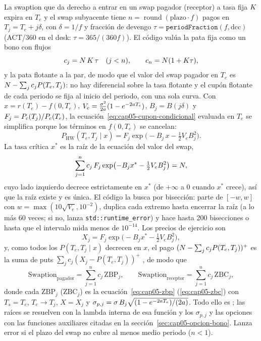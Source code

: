 La swaption que da derecho a entrar en un swap pagador (receptor) a tasa fija $K$ expira en $T_e$ y el swap
subyacente tiene $n=\operatorname{round}(\text{plazo}\cdot f)$ pagos en $T_j=T_e+j\delta$, con $\delta=1/f$
y fracción de devengo $\tau=\texttt{periodFraction}(f,\mathrm{dcc})$ (ACT/360 en el desk: $\tau=365/(360f)$).
El código valúa la pata fija como un bono con flujos
\begin{equation}\label{eq:cap05-flujos}
  c_j = N\,K\,\tau\quad(j<n),\qquad c_n=N(1+K\tau),
\end{equation}
y la pata flotante a la par, de modo que el valor del swap pagador en $T_e$ es
$N-\sum_jc_jP(T_e,T_j)$: no hay diferencial sobre la tasa flotante y el cupón flotante de cada periodo
se fija al inicio del periodo, con una sola curva. Con $x=r(T_e)-f(0,T_e)$, $V_e=\frac{\sigma^2}{2a}(1-e^{-2a
T_e})$, $B_j=B(j\delta)$ y $F_j=P_{c}(T_j)/P_{c}(T_e)$, la ecuación~\eqref{eq:cap05-cupon-condicional}
evaluada en $T_e$ se simplifica porque los términos en $f(0,T_e)$ se cancelan:
\begin{equation}\label{eq:cap05-cupon-x}
  P_{\mathrm{HW}}(T_e,T_j\mid x) = F_j\exp\bigl(-B_j\,x-\tfrac12V_eB_j^{2}\bigr).
\end{equation}
La tasa crítica $x^*$ es la raíz de la ecuación del valor del swap,
\begin{equation}\label{eq:cap05-critica}
  \sum_{j=1}^{n}c_j\,F_j\exp\bigl(-B_jx^*-\tfrac12V_eB_j^{2}\bigr)=N,
\end{equation}
cuyo lado izquierdo decrece estrictamente en $x^*$ (de $+\infty$ a $0$ cuando $x^*$ crece), así que la raíz
existe y es única. El código la busca por bisección: parte de $[-w,w]$ con
$w=\max(10\sqrt{V_e},10^{-2})$, duplica cada extremo hasta encerrar la raíz (a lo más 60 veces; si no, lanza
\texttt{std::runtime\_error}) y hace hasta 200 bisecciones o hasta que el intervalo mida menos de $10^{-14}$.
Los precios de ejercicio son
\begin{equation}\label{eq:cap05-strikes}
  X_j = F_j\exp\bigl(-B_jx^*-\tfrac12V_eB_j^{2}\bigr),
\end{equation}
y, como todos los $P(T_e,T_j\mid x)$ decrecen en $x$, el pago $(N-\sum_jc_jP(T_e,T_j))^+$ es la suma de
puts $\sum_jc_j(X_j-P(T_e,T_j))^+$ \citep{jamshidian1989}, de modo que
\begin{equation}\label{eq:cap05-swaption}
  \mathrm{Swaption}_{\text{pagador}}=\sum_{j=1}^{n}c_j\,\mathrm{ZBP}_j,\qquad
  \mathrm{Swaption}_{\text{receptor}}=\sum_{j=1}^{n}c_j\,\mathrm{ZBC}_j,
\end{equation}
donde cada $\mathrm{ZBP}_j$ ($\mathrm{ZBC}_j$) es la ecuación~\eqref{eq:cap05-zbp} (\eqref{eq:cap05-zbc}) con
$T_s=T_e$, $T_e\to T_j$, $X=X_j$ y $\sigma_{p,j}=\sigma\,B_j\sqrt{(1-e^{-2a T_e})/(2a)}$. Todo ello es
; las raíces se resuelven con la lambda interna de esa
función y los $\sigma_{p,j}$ y las opciones con las funciones auxiliares citadas en la
sección~\ref{sec:cap05-opcion-bono}. Lanza error si el plazo del swap no cubre al menos medio periodo
($n<1$).

